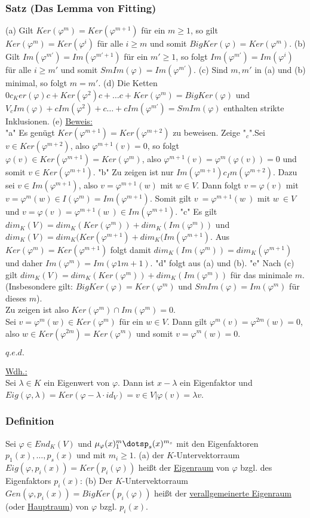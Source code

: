 \documentclass[a4paper]{article}
\newcommand{\ul}{\underline}
\renewcommand{\qed}{\begin{flushright}
\ul{\(q.e.d.\)}
\end{flushright}}
\let\phi\varphi
\begin{document}
\subsubsection{Satz (Das Lemma von Fitting)}
(a) Gilt \(Ker(\phi^m)=Ker(\phi^{m+1})\) für ein \(m \geq 1\), so gilt \(Ker(\phi^m)=Ker(\phi^i)\) für alle \(i \geq m\) und somit \(BigKer(\phi)=Ker(\phi^m)\).
(b) Gilt \(Im(\phi^{m'})=Im(\phi^{m'+1})\) für ein \(m' \geq 1\), so folgt \(Im(\phi^{m'})=Im(\phi^i)\) für alle \(i \geq m'\) und somit \(SmIm(\phi)=Im(\phi^{m'})\).
(c) Sind \(m,m'\) in (a) und (b) minimal, so folgt \(m=m'\).
(d) Die Ketten \({0} c_ Ker(\phi) c+ Ker(\phi^2) c+ \dots c+ Ker(\phi^m)=BigKer(\phi)\) und \(V _c Im(\phi) +c Im(\phi^2) +c \dots +c Im(\phi^{m'}) = SmIm(\phi)\) enthalten strikte Inklusionen.
(e) \fbox{\(V=BigKer(\phi) o+ SmIm(\phi)\)}
\ul{Beweis:}\\
"a" Es genügt \(Ker(\phi^{m+1}) =Ker(\phi^{m+2})\) zu beweisen. Zeige "\(_c\)".Sei \(v \in Ker(\phi^{m+2})\), also \(\phi^{m+1}(v)=0\), so folgt \(\phi(v)\in Ker(\phi^{m+1})=Ker(\phi^m)\), also \(\phi^{m+1}(v)= \phi^m(\phi(v))=0\) und somit \(v \in Ker(\phi^{m+1})\).
"b" Zu zeigen ist nur \(Im(\phi^{m+1}) c_ Im(\phi^{m+2})\). Dazu sei \(v\in Im(\phi^{m+1})\), also \(v=\phi^{m+1}(w)\) mit \(w\in V\). Dann folgt \(v=\phi(\overset{~}{v})\) mit \(\overset{~}{v} = \phi^m(w)\in I(\phi^m)=Im(\phi^{m+1})\). Somit gilt \(v~ = \phi^{m+1}(w~)\) mit \(w~ \in V\) und \(v=\phi(v~)=\phi^{m+1}(w~)\in Im(\phi^{m+1})\).
"c" Es gilt \(dim_K(V)=dim_K(Ker(\phi^m))+dim_K(Im(\phi^m))\) und \(dim_K(V)=dim_K(Ker(\phi^{m+1})+dim_K(Im(\phi^{m+1})\).
Aus \(Ker(\phi^m)=Ker(\phi^{m+1})\) folgt damit \(dim_K(Im(\phi^m))=dim_K(\phi^{m+1})\) und daher \(Im(\phi^m)=Im(\phi1{m+1})\).
"d" folgt aus (a) und (b).
"e" Nach (c) gilt \(dim_K(V)=dim_K(Ker(\phi^m))+dim_K(Im(\phi^m))\) für das minimale \(m\). (Insbesondere gilt: \(BigKer(\phi)=Ker(\phi^m)\) und \(SmIm(\phi)=Im(\phi^m)\) für dieses \(m\)).\\
Zu zeigen ist also \(Ker(\phi^m) \cap Im(\phi^m)={0}\).\\
Sei \(v = \phi^m(w)\in Ker(\phi^m)\) für ein \(w\in V\). Dann gilt \(\phi^m(v)=\phi^{2m}(w)=0\), also \(w\in Ker(\phi^{2m})=Ker(\phi^m)\) und somit \(v=\phi^m(w)=0\).
\qed
\ul{Wdh.:}\\
Sei \(\lambda\in K\) ein Eigenwert von \(\phi\). Dann ist \(x-\lambda\) ein Eigenfaktor und \(Eig(\phi, \lambda)=Ker(\phi-\lambda\cdot id_V)={v\in V | \phi(v)=\lambda v}\).
\subsubsection{Definition}
Sei \(\phi\in End_K(V)\) und \(\mu_\phi(x)^m_1\dotsp_s(x)^{m_s}\) mit den Eigenfaktoren \(p_1(x),\dots,p_s(x)\) und mit \(m_i\geq 1\).
(a) der \(K\)-Untervektorraum \(Eig(\phi, p_i(x)) = Ker(p_i(\phi))\) heißt der \ul{Eigenraum} von \(\phi\) bzgl. des Eigenfaktors \(p_i(x)\):
(b) Der \(K\)-Untervektorraum \(Gen(\phi, p_i(x))=BigKer(p_i(\phi))\) heißt der \ul{verallgemeinerte  Eigenraum} (oder \ul{Hauptraum}) von \(\phi\) bzgl. \(p_i(x)\).
\end{document}
